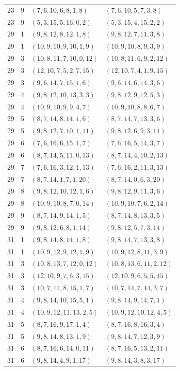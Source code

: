 \begin{longtable}{rrll}
23&9&$(7,6,10,6,8,1,8)$&$(7,6,10,5,7,3,8)$\\
23&9&$(5,3,15,5,16,0,2)$&$(5,3,15,4,15,2,2)$\\
29&1&$(9,8,12,8,12,1,8)$&$(9,8,12,7,11,3,8)$\\
29&1&$(10,9,10,9,10,1,9)$&$(10,9,10,8,9,3,9)$\\
29&3&$(10,8,11,7,10,0,12)$&$(10,8,11,6,9,2,12)$\\
29&3&$(12,10,7,5,2,7,15)$&$(12,10,7,4,1,9,15)$\\
29&3&$(9,6,14,7,15,1,6)$&$(9,6,14,6,14,3,6)$\\
29&4&$(9,8,12,10,13,3,3)$&$(9,8,12,9,12,5,3)$\\
29&4&$(10,9,10,9,9,4,7)$&$(10,9,10,8,8,6,7)$\\
29&5&$(8,7,14,8,14,1,6)$&$(8,7,14,7,13,3,6)$\\
29&5&$(9,8,12,7,10,1,11)$&$(9,8,12,6,9,3,11)$\\
29&6&$(7,6,16,6,15,1,7)$&$(7,6,16,5,14,3,7)$\\
29&6&$(8,7,14,5,11,0,13)$&$(8,7,14,4,10,2,13)$\\
29&7&$(7,6,16,3,12,1,13)$&$(7,6,16,2,11,3,13)$\\
29&7&$(8,7,14,1,7,1,20)$&$(8,7,14,0,6,3,20)$\\
29&8&$(9,8,12,10,12,1,6)$&$(9,8,12,9,11,3,6)$\\
29&8&$(10,9,10,8,7,0,14)$&$(10,9,10,7,6,2,14)$\\
29&9&$(8,7,14,9,14,1,5)$&$(8,7,14,8,13,3,5)$\\
29&9&$(9,8,12,6,8,1,14)$&$(9,8,12,5,7,3,14)$\\
31&1&$(9,8,14,8,14,1,8)$&$(9,8,14,7,13,3,8)$\\
31&1&$(10,9,12,9,12,1,9)$&$(10,9,12,8,11,3,9)$\\
31&3&$(10,8,13,7,12,0,12)$&$(10,8,13,6,11,2,12)$\\
31&3&$(12,10,9,7,6,3,15)$&$(12,10,9,6,5,5,15)$\\
31&3&$(10,7,14,8,15,1,7)$&$(10,7,14,7,14,3,7)$\\
31&4&$(9,8,14,10,15,5,1)$&$(9,8,14,9,14,7,1)$\\
31&4&$(10,9,12,11,13,2,5)$&$(10,9,12,10,12,4,5)$\\
31&5&$(8,7,16,9,17,1,4)$&$(8,7,16,8,16,3,4)$\\
31&5&$(9,8,14,8,13,1,9)$&$(9,8,14,7,12,3,9)$\\
31&6&$(8,7,16,6,14,0,11)$&$(8,7,16,5,13,2,11)$\\
31&6&$(9,8,14,4,9,1,17)$&$(9,8,14,3,8,3,17)$\\

\end{longtable}
